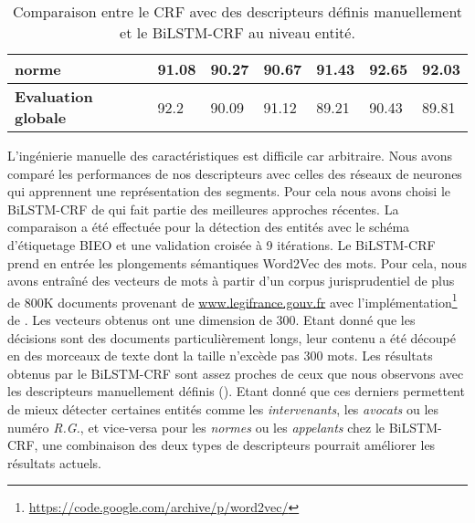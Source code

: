 \begin{table}[!ht]
\begin{tabular}{|l|l|l|l|l|l|l|}
		\textbf{norme}         & 91.08              & 90.27                               & 90.67       & 91.43              & 92.65                & 92.03       \\ \hline
		\noalign{\smallskip}\hline\noalign{\smallskip}
		\textbf{Evaluation globale} & 92.2               & 90.09                               & 91.12       & 89.21              & 90.43                & 89.81       \\ \hline
	\end{tabular}
	\caption{Comparaison entre le CRF avec des descripteurs définis manuellement et le BiLSTM-CRF au niveau entité.}\label{tab:structuration:perf-bilstmcrf}
\end{table}

L'ingénierie manuelle des caractéristiques est difficile car arbitraire. Nous avons comparé les performances de nos descripteurs avec celles des réseaux de neurones qui apprennent une représentation des segments. Pour cela nous avons choisi le BiLSTM-CRF de \citet{lample2016nnner} qui fait partie des meilleures approches récentes. La comparaison a été effectuée pour la détection des entités avec le schéma d'étiquetage BIEO et une validation croisée à 9 itérations. Le BiLSTM-CRF prend en entrée les plongements sémantiques Word2Vec \citep{mikolov2013word2vec} des mots. Pour cela, nous avons entraîné des vecteurs de mots à partir d'un corpus jurisprudentiel de plus de 800K documents provenant de \url{www.legifrance.gouv.fr} avec l'implémentation\footnote{\url{https://code.google.com/archive/p/word2vec/}} de \citet{mikolov2013word2vec}. Les vecteurs obtenus ont une dimension de 300. Etant donné que les décisions sont des documents particulièrement longs, leur contenu a été découpé en des morceaux de texte dont la taille n'excède pas 300 mots. Les résultats obtenus par le BiLSTM-CRF sont assez proches de ceux que nous observons avec les descripteurs manuellement définis (). Etant donné que ces derniers permettent de mieux détecter certaines entités comme les \textit{intervenants}, les \textit{avocats} ou les numéro \textit{R.G.}, et vice-versa pour les \textit{normes} ou les \textit{appelants} chez le BiLSTM-CRF, une combinaison des deux types de descripteurs pourrait améliorer les résultats actuels. %
 
